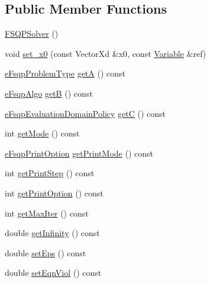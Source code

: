 \subsection*{Public Member Functions}
\begin{DoxyCompactItemize}
\item 
\hyperlink{classocra_1_1FSQPSolver_a8eeae2b05133e4f5e134fc1ee11ccb49}{F\+S\+Q\+P\+Solver} ()
\item 
void \hyperlink{classocra_1_1FSQPSolver_a17f6a88734d636c6e1af46d15d4b3e96}{set\+\_\+x0} (const Vector\+Xd \&x0, const \hyperlink{classocra_1_1Variable}{Variable} \&ref)
\item 
\hyperlink{classocra_1_1FSQPSolver_a1a9c37974603d734acab0d75bc9462ac}{e\+Fsqp\+Problem\+Type} \hyperlink{classocra_1_1FSQPSolver_a18aeab2da127023221593a0be72dff96}{getA} () const 
\item 
\hyperlink{classocra_1_1FSQPSolver_ad43d4e2dae6954df05123077cea0b7f5}{e\+Fsqp\+Algo} \hyperlink{classocra_1_1FSQPSolver_a7a337be237b3b0240e524bf6802c672d}{getB} () const 
\item 
\hyperlink{classocra_1_1FSQPSolver_a0569ab06022ffef1bd6d97599a5e4279}{e\+Fsqp\+Evaluation\+Domain\+Policy} \hyperlink{classocra_1_1FSQPSolver_af7d56822e5bf74438a622b8b6b14cdef}{getC} () const 
\item 
int \hyperlink{classocra_1_1FSQPSolver_aaf6c15ec76c2ac3b7dedc243c3d0e5ce}{get\+Mode} () const 
\item 
\hyperlink{classocra_1_1FSQPSolver_a4bb0d1e3b6b82bd9f683c6c7393f062d}{e\+Fsqp\+Print\+Option} \hyperlink{classocra_1_1FSQPSolver_a84adc5925db95fd3e24574ddb4052d2b}{get\+Print\+Mode} () const 
\item 
int \hyperlink{classocra_1_1FSQPSolver_aaed5254a7540d8687744d3378f4905d5}{get\+Print\+Step} () const 
\item 
int \hyperlink{classocra_1_1FSQPSolver_a7bcb92f482c1e6e900481ca61b79bb73}{get\+Print\+Option} () const 
\item 
int \hyperlink{classocra_1_1FSQPSolver_a3ee5347e591f885dffc795abb317e7e7}{get\+Max\+Iter} () const 
\item 
double \hyperlink{classocra_1_1FSQPSolver_aab3935b6092dff265d0613b546fa994d}{get\+Infinity} () const 
\item 
double \hyperlink{classocra_1_1FSQPSolver_a4d6d1789637de9cc923b1527cc67426a}{set\+Eps} () const 
\item 
double \hyperlink{classocra_1_1FSQPSolver_a2a158733fe5811688917f2c53040e370}{set\+Eqn\+Viol} () const 
\item 

\end{DoxyCompactItemize}
